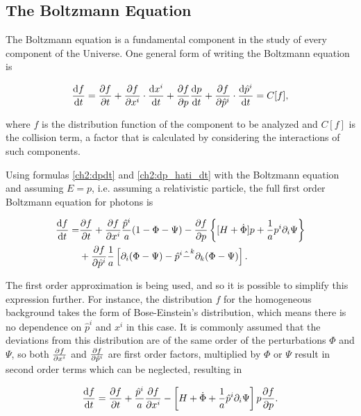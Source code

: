 \documentclass[openany,a4paper,12pt,oneside]{book}
\begin{document}
\begin{spacing}{1.5}
\subsection{The Boltzmann Equation}

The Boltzmann equation is a fundamental component in the study of every component of the Universe. One general form of writing the Boltzmann equation is

\begin{equation}\label{ch2:Boltzmann_general}
    \dv{f}{t}=\pdv{f}{t}+\pdv{f}{x^i}\cdot \dv{x^i}{t}+\pdv{f}{p}\dv{p}{t}+\pdv{f}{\hat{p}^i}\cdot \dv{\hat{p}^i}{t}=C[f],
\end{equation}

\noindent where $f$ is the distribution function of the component to be analyzed and $C[f]$ is the collision term, a factor that is calculated by considering the interactions of such components.

Using formulas \eqref{ch2:dpdt} and \eqref{ch2:dp_hati_dt} with the Boltzmann equation and assuming $E=p$, i.e. assuming a relativistic particle, the full first order Boltzmann equation for photons is

\begin{equation}\label{ch2:full_photon_boltzmann_eq}
\begin{split}
    \dv{f}{t}=&\pdv{f}{t}+\pdv{f}{x^i}\frac{\hat{p}^i}{a}(1-\Phi-\Psi)-\pdv{f}{p}\left\{[H+\dot{\Phi}]p +\frac{1}{a}p^i\partial_i\Psi\right\}\\
    &+\pdv{f}{\hat{p}^i}\frac{1}{a}\left[\partial_i(\Phi-\Psi)-\hat{p}^i\hat{-}^k\partial_k(\Phi-\Psi)\right].
\end{split}
\end{equation}

The first order approximation is being used, and so it is possible to simplify this expression further. For instance, the distribution $f$ for the homogeneous background takes the form of Bose-Einstein's distribution, which means there is no dependence on $\hat{p}^i$ and $x^i$ in this case. It is commonly assumed that the deviations from this distribution are of the same order of the perturbations $\Phi$ and $\Psi$, so both $\pdv{f}{x^i}$ and $\pdv{f}{\hat{p}^i}$ are first order factors, multiplied by $\Phi$ or $\Psi$ result in second order terms which can be neglected, resulting in

\begin{equation}\label{ch2:Boltzmann_photon_final}
    \dv{f}{t}=\pdv{f}{t}+\frac{\hat{p}^i}{a}\pdv{f}{x^i}-\left[H+\dot{\Phi}+\frac{1}{a}\hat{p}^i\partial_i\Psi\right]p\pdv{f}{p}.
\end{equation}


\end{spacing}
\end{document}
